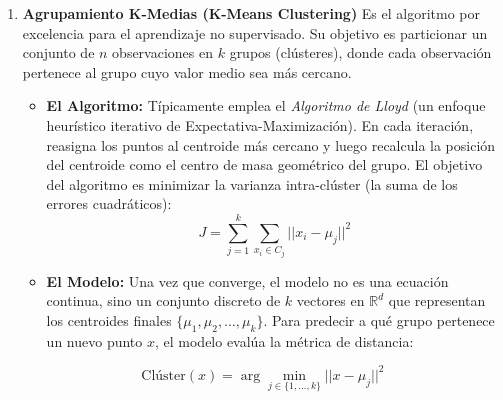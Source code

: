\begin{enumerate}
\begin{itemize}
    \item \textbf{El Algoritmo:} Utiliza la estimación de Máxima Probabilidad a Posteriori (MAP) contando frecuencias en los datos de entrenamiento para calcular empíricamente la probabilidad a priori de cada clase $P(y)$ y las probabilidades condicionales de cada característica $P(x_i | y)$.
    \item \textbf{El Modelo:} Es una regla de decisión matemática. Para una nueva observación con características $x = (x_1, \dots, x_n)$, el modelo asigna la clase $\hat{y}$ que maximiza la probabilidad conjunta (gracias al supuesto de independencia):
\end{itemize}
\begin{equation}
    \hat{y} = \arg \max_{y} P(y) \prod_{i=1}^{n} P(x_i \mid y)
\end{equation}

\item  {\bf Agrupamiento K-Medias (K-Means Clustering)}
Es el algoritmo por excelencia para el aprendizaje no supervisado. Su objetivo es particionar un conjunto de $n$ observaciones en $k$ grupos (clústeres), donde cada observación pertenece al grupo cuyo valor medio sea más cercano.

\begin{itemize}
    \item \textbf{El Algoritmo:} Típicamente emplea el \textit{Algoritmo de Lloyd} (un enfoque heurístico iterativo de Expectativa-Maximización). En cada iteración, reasigna los puntos al centroide más cercano y luego recalcula la posición del centroide como el centro de masa geométrico del grupo. El objetivo del algoritmo es minimizar la varianza intra-clúster (la suma de los errores cuadráticos):
    \begin{equation}
        J = \sum_{j=1}^{k} \sum_{x_i \in C_j} || x_i - \mu_j ||^2
    \end{equation}
    \item \textbf{El Modelo:} Una vez que converge, el modelo no es una ecuación continua, sino un conjunto discreto de $k$ vectores en $\mathbb{R}^d$ que representan los centroides finales $\{ \mu_1, \mu_2, \dots, \mu_k \}$. Para predecir a qué grupo pertenece un nuevo punto $x$, el modelo evalúa la métrica de distancia:
\end{itemize}
\begin{equation}
    \text{Clúster}(x) = \arg \min_{j \in \{1, \dots, k\}} || x - \mu_j ||^2
\end{equation}


\end{enumerate}
